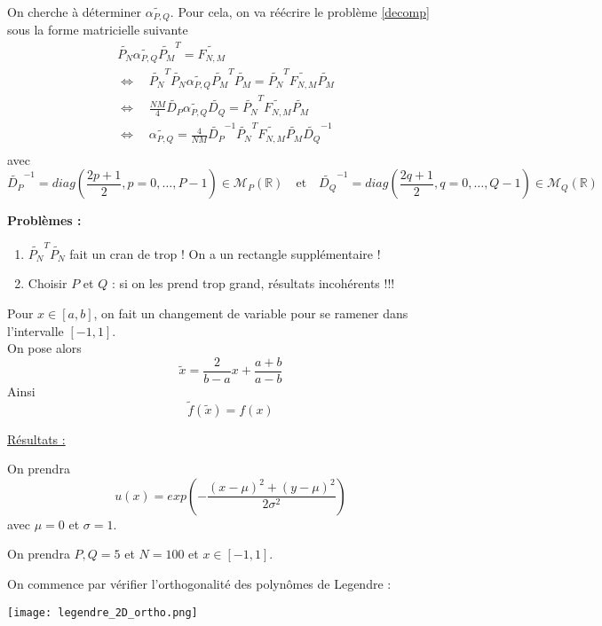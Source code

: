 On cherche à déterminer $\widetilde{\alpha_{P,Q}}$. Pour cela, on va réécrire le problème \ref{decomp} sous la forme matricielle suivante
\begin{align*}
	\widetilde{P_N}\widetilde{\alpha_{P,Q}}\widetilde{P_M}^T=\widetilde{F_{N,M}}& \\
	\iff \quad \widetilde{P_N}^T\widetilde{P_N}\widetilde{\alpha_{P,Q}}\widetilde{P_M}^T\widetilde{P_M}=\widetilde{P_N}^T\widetilde{F_{N,M}}\widetilde{P_M}& \\
	\iff \quad \frac{NM}{4}\widetilde{D_P}\widetilde{\alpha_{P,Q}}\widetilde{D_Q}=\widetilde{P_N}^T\widetilde{F_{N,M}}\widetilde{P_M}& \\
	\iff \quad \boxed{\widetilde{\alpha_{P,Q}}=\frac{4}{NM}\widetilde{D_P}^{-1}\widetilde{P_N}^T\widetilde{F_{N,M}}\widetilde{P_M}\widetilde{D_Q}^{-1}}& \\
\end{align*}
avec
$$\widetilde{D_P}^{-1}=diag\left(\frac{2p+1}{2},p=0,\dots,P-1\right)\in\mathcal{M}_P(\mathbb{R}) \quad \text{et} \quad \widetilde{D_Q}^{-1}=diag\left(\frac{2q+1}{2},q=0,\dots,Q-1\right)\in\mathcal{M}_Q(\mathbb{R})$$

\color{red}
\textbf{Problèmes :}
\begin{enumerate}
	\item $\widetilde{P_N}^T\widetilde{P_N}$ fait un cran de trop ! On a un rectangle supplémentaire !
	\item Choisir $P$ et $Q$ : si on les prend trop grand, résultats incohérents !!!
\end{enumerate}
\color{black}

\begin{Rem}
	Pour $x\in[a,b]$, on fait un changement de variable pour se ramener dans l'intervalle $[-1,1]$. \\
	On pose alors
	$$\tilde{x}=\frac{2}{b-a}x+\frac{a+b}{a-b}$$
	Ainsi
	$$\tilde{f}(\tilde{x})=f(x)$$
\end{Rem}


\underline{Résultats :}

On prendra
$$u(x)=exp\left(-\frac{(x-\mu)^2+(y-\mu)^2}{2\sigma^2}\right)$$
avec $\mu=0$ et $\sigma=1$.

On prendra $P,Q=5$ et $N=100$ et $x\in[-1,1]$.

On commence par vérifier l'orthogonalité des polynômes de Legendre :

\begin{minipage}{\linewidth}
	\centering
	\texttt{[image: legendre\_2D\_ortho.png]}
\end{minipage}

